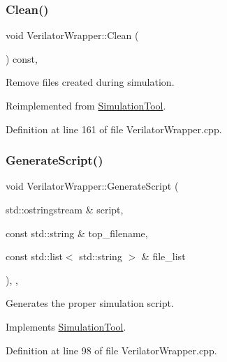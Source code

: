 \subsubsection{\texorpdfstring{Clean()}{Clean()}}
{\footnotesize\ttfamily void Verilator\+Wrapper\+::\+Clean (\begin{DoxyParamCaption}{ }\end{DoxyParamCaption}) const\hspace{0.3cm}{\ttfamily [override]}, {\ttfamily [virtual]}}



Remove files created during simulation. 



Reimplemented from \hyperlink{classSimulationTool_a200fbae071dc751132117e922cf8ffc3}{Simulation\+Tool}.



Definition at line 161 of file Verilator\+Wrapper.\+cpp.

\mbox{\label{classVerilatorWrapper_a4f67b56da53843f72ba663dfee9a2b5a}} 
\subsubsection{\texorpdfstring{Generate\+Script()}{GenerateScript()}}
{\footnotesize\ttfamily void Verilator\+Wrapper\+::\+Generate\+Script (\begin{DoxyParamCaption}\item[{std\+::ostringstream \&}]{script,  }\item[{const std\+::string \&}]{top\+\_\+filename,  }\item[{const std\+::list$<$ std\+::string $>$ \&}]{file\+\_\+list }\end{DoxyParamCaption})\hspace{0.3cm}{\ttfamily [override]}, {\ttfamily [private]}, {\ttfamily [virtual]}}



Generates the proper simulation script. 



Implements \hyperlink{classSimulationTool_afd99529bb7adb46081071097ceae7643}{Simulation\+Tool}.



Definition at line 98 of file Verilator\+Wrapper.\+cpp.




